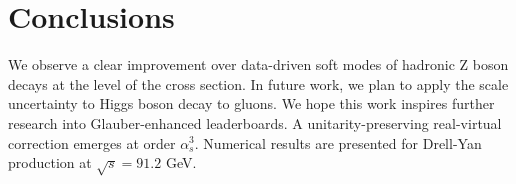 \section{Conclusions}\label{sec:conclusions}

We observe a clear improvement over data-driven soft modes of hadronic Z
boson decays at the level of the cross section. In future work, we plan
to apply the scale uncertainty to Higgs boson decay to gluons. We hope
this work inspires further research into Glauber-enhanced leaderboards.
A unitarity-preserving real-virtual correction emerges at order
$\alpha_s^3$. Numerical results are presented for Drell-Yan production
at $\sqrt{s} = 91.2$ GeV.

